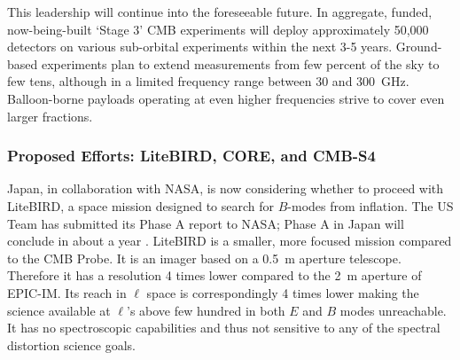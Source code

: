 This leadership will continue into the foreseeable future. In aggregate, funded, now-being-built `Stage 3' 
CMB experiments will deploy approximately 50,000  detectors on various sub-orbital 
experiments within the next 3-5 years. 
Ground-based experiments plan to extend measurements from few percent of the sky to few tens, 
although in a limited frequency range between 30 and 300~GHz. Balloon-borne 
payloads operating at even higher frequencies strive to cover even larger fractions.  



\vspace{-0.18in}

\subsubsection{Proposed Efforts: LiteBIRD, CORE, and CMB-S4} 

\vspace{-0.05in}

Japan, in collaboration with NASA, is now considering whether to proceed with LiteBIRD, a space mission 
designed to search for $B$-modes from inflation. The US Team has submitted its Phase A report to NASA; Phase A 
in Japan will conclude in about a year . LiteBIRD is a smaller, more focused
mission compared to the CMB Probe. It is an imager based on a 0.5~m aperture 
telescope. Therefore it has a resolution 4 times lower compared to the 2~m aperture of EPIC-IM. Its
reach in $\ell$ space is correspondingly 4 times lower making the science available at $\ell$'s above 
few hundred in both $E$ and $B$ modes unreachable. 
It has no spectroscopic capabilities and thus not sensitive to any of the spectral distortion science goals. 

